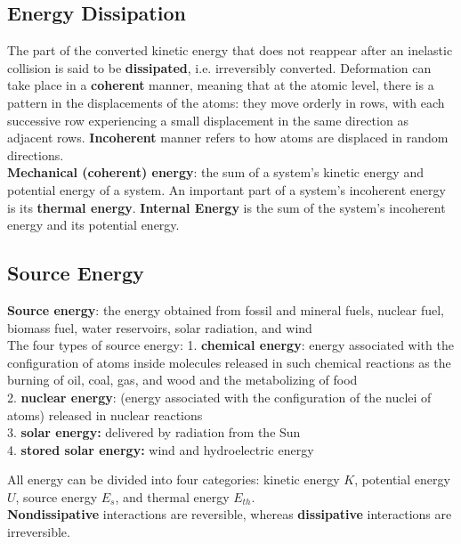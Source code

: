     \subsection{Energy Dissipation}

        The part of the converted kinetic energy that does not reappear after an inelastic collision is said to be \textbf{dissipated}, i.e. irreversibly converted. Deformation can take place in a \textbf{coherent}
        manner, meaning that at the atomic level, there is a pattern in the displacements of the atoms: they move orderly in rows, with each successive row experiencing a small displacement in the same direction as
        adjacent rows. \textbf{Incoherent} manner refers to how atoms are displaced in random directions. \\

        \textbf{Mechanical (coherent) energy}: the sum of a system's kinetic energy and potential energy of a system. An important part of a system's incoherent energy is its \textbf{thermal energy}.
        \textbf{Internal Energy} is the sum of the system's incoherent energy and its potential energy.


    \subsection{Source Energy}

        \textbf{Source energy}: the energy obtained from fossil and mineral fuels, nuclear fuel, biomass fuel, water reservoirs, solar radiation, and wind \\

        The four types of source energy:
        1. \textbf{chemical energy}: energy associated with the configuration of atoms inside molecules released in such chemical reactions as the burning of oil, coal, gas, and wood and the metabolizing of food \\
        2. \textbf{nuclear energy}: (energy associated with the configuration of the nuclei of atoms) released in nuclear reactions \\
        3. \textbf{solar energy:} delivered by radiation from the Sun \\
        4. \textbf{stored solar energy:} wind and hydroelectric energy

        All energy can be divided into four categories: kinetic energy $K$, potential energy $U$, source energy $E_s$, and thermal energy $E_{th}$. \\

        \textbf{Nondissipative} interactions are reversible, whereas \textbf{dissipative} interactions are irreversible.


